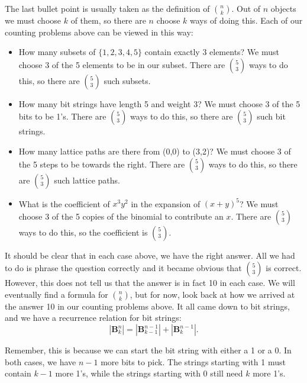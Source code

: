 \documentclass[10pt,]{book}
\theoremstyle{plain}
\theoremstyle{definition}
\theoremstyle{definition}
\theoremstyle{definition}
\numberwithin{equation}{chapter}
\def\B{\mathbf{B}}
\begin{document}
        The last bullet point is usually taken as the definition of \({n \choose k}\). Out of \(n\) objects we must choose \(k\) of them, so there are \(n\) choose \(k\) ways of doing this. Each of our counting problems above can be viewed in this way:
\leavevmode%
\begin{itemize}[label=\textbullet]
\item{}
How many subsets of \(\{1,2,3,4,5\}\) contain exactly 3 elements?  We must choose \(3\) of the 5 elements to be in our subset.  There are \({5 \choose 3}\) ways to do this, so there are \({5 \choose 3}\) such subsets.
%
\item{}
How many bit strings have length 5 and weight 3?  We must choose \(3\) of the 5 bits to be 1's.  There are \({5 \choose 3}\) ways to do this, so there are \({5 \choose 3}\) such bit strings.
%
\item{}
How many lattice paths are there from (0,0) to (3,2)?  We must choose 3 of the 5 steps to be towards the right.  There are \({5 \choose 3}\) ways to do this, so there are \({5 \choose 3}\) such lattice paths.
%
\item{}
What is the coefficient of \(x^3y^2\) in the expansion of \((x+y)^5\)?  We must choose 3 of the 5 copies of the binomial to contribute an \(x\).  There are \({5 \choose 3}\) ways to do this, so the coefficient is \({5 \choose 3}\).
%
\end{itemize}
\par

        It should be clear that in each case above, we have the right answer. All we had to do is phrase the question correctly and it became obvious that \({5 \choose 3}\) is correct. However, this does not tell us that the answer is in fact 10 in each case. We will eventually find a formula for \({n \choose k}\), but for now, look back at how we arrived at the answer 10 in our counting problems above. It all came down to bit strings, and we have a recurrence relation for bit strings:
        \begin{equation*}
          |\B^n_k| = |\B^{n-1}_{k-1}| + |\B^{n-1}_k|.
        \end{equation*}
\par

        Remember, this is because we can start the bit string with either a 1 or a 0. In both cases, we have \(n-1\) more bits to pick. The strings starting with 1 must contain \(k-1\) more 1's, while the strings starting with 0 still need \(k\) more 1's.
\par
\end{document}
